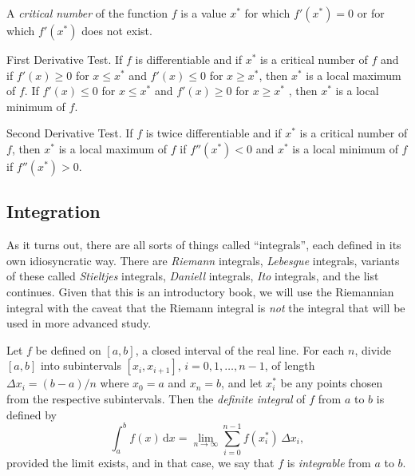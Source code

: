 \documentclass[captions=tableheading]{scrbook}
\begin{document}
\begin{defn}
A \emph{critical number} of the function $f$ is a value $x^{\ast}$ for which $f'(x^{\ast})=0$ or for which $f'(x^{\ast})$ does not exist.
\end{defn}

\begin{thm}
\label{thm:First-Derivative-Test}
First Derivative Test. If $f$ is differentiable and if $x^{\ast}$ is a critical number of $f$ and if $f'(x)\geq0$ for $x\leq x^{\ast}$ and $f'(x)\leq0$ for $x\geq x^{\ast}$, then $x^{\ast}$ is a local maximum of $f$. If $f'(x)\leq0$ for $x\leq x^{\ast}$ and $f'(x)\geq0$ for $x\geq x^{\ast}$ , then $x^{\ast}$ is a local minimum of $f$.
\end{thm}

\begin{thm}
Second Derivative Test. If $f$ is twice differentiable and if $x^{\ast}$ is a critical number of $f$, then $x^{\ast}$ is a local maximum of $f$ if $f''(x^{\ast})<0$ and $x^{\ast}$ is a local minimum of $f$ if $f''(x^{\ast})>0$.
\end{thm}
\subsection{Integration}
\label{sec-6-2-4}

As it turns out, there are all sorts of things called ``integrals'', each defined in its own idiosyncratic way. There are \emph{Riemann} integrals, \emph{Lebesgue} integrals, variants of these called \emph{Stieltjes} integrals, \emph{Daniell} integrals, \emph{Ito} integrals, and the list continues. Given that this is an introductory book, we will use the Riemannian integral with the caveat that the Riemann integral is \emph{not} the integral that will be used in more advanced study.

\begin{defn}
Let $f$ be defined on $[a,b]$, a closed interval of the real line. For each $n$, divide $[a,b]$ into subintervals $[x_{i},x_{i+1}]$, $i=0,1,\ldots,n-1$, of length $\Delta x_{i}=(b-a)/n$ where $x_{0}=a$ and $x_{n}=b$, and let $x_{i}^{\ast}$ be any points chosen from the respective subintervals. Then the \emph{definite integral} of $f$ from $a$ to $b$ is defined by
\begin{equation}
\int_{a}^{b}f(x)\,\mathrm{d} x=\lim_{n\to\infty}\sum_{i=0}^{n-1}f(x_{i}^{\ast})\,\Delta x_{i},
\end{equation}
provided the limit exists, and in that case, we say that $f$ is \emph{integrable} from $a$ to $b$. 
\end{defn}
\end{document}

